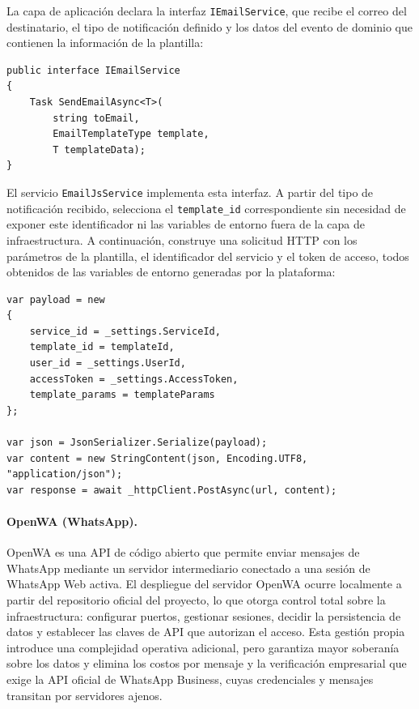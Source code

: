 La capa de aplicación declara la interfaz \texttt{IEmailService}, que recibe el correo del destinatario, el tipo de notificación definido y los datos del evento de dominio que contienen la información de la plantilla:

\begin{lstlisting}[language={[Sharp]C}, caption={Interfaz genérica de envío de correos}, label={lst:iemailservice}]
public interface IEmailService
{
    Task SendEmailAsync<T>(
        string toEmail,
        EmailTemplateType template,
        T templateData);
}
\end{lstlisting}

El servicio \texttt{EmailJsService} implementa esta interfaz. 
A partir del tipo de notificación recibido, selecciona el \texttt{template\_id} correspondiente sin necesidad de exponer este identificador ni las variables de entorno fuera de la capa de infraestructura.
A continuación, construye una solicitud HTTP con los parámetros de la plantilla, el identificador del servicio y el token de acceso, todos obtenidos de las variables de entorno generadas por la plataforma:

\begin{lstlisting}[language={[Sharp]C}, caption={Construcción y envío de la solicitud a la API de EmailJS}, label={lst:emailjs}]
var payload = new
{
    service_id = _settings.ServiceId,       
    template_id = templateId,                
    user_id = _settings.UserId,             
    accessToken = _settings.AccessToken,   
    template_params = templateParams
};

var json = JsonSerializer.Serialize(payload);
var content = new StringContent(json, Encoding.UTF8, "application/json");
var response = await _httpClient.PostAsync(url, content);
\end{lstlisting}


\paragraph{OpenWA (WhatsApp).}

OpenWA es una API de código abierto que permite enviar mensajes de WhatsApp mediante un servidor intermediario conectado a una sesión de WhatsApp Web activa. 
El despliegue del servidor OpenWA ocurre localmente a partir del repositorio oficial del proyecto, lo que otorga control total sobre la infraestructura: configurar puertos, gestionar sesiones, decidir la persistencia de datos y establecer las claves de API que autorizan el acceso.
Esta gestión propia introduce una complejidad operativa adicional, pero garantiza mayor soberanía sobre los datos y elimina los costos por mensaje y la verificación empresarial que exige la API oficial de WhatsApp Business, cuyas credenciales y mensajes transitan por servidores ajenos.

